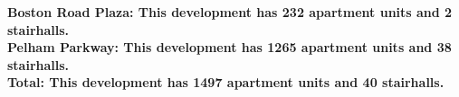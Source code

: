 \bf{Boston Road Plaza}: This development has 232 apartment units and 2 stairhalls.\\\bf{Pelham Parkway}: This development has 1265 apartment units and 38 stairhalls.\\\bf{Total}: This development has 1497 apartment units and 40 stairhalls.\\